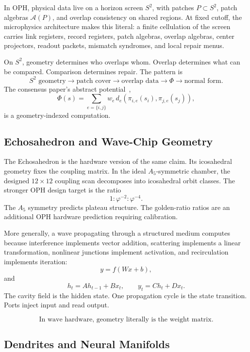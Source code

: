 \documentclass[11pt]{article}
\theoremstyle{remark}
\theoremstyle{plain}
\begin{document}
In OPH, physical data live on a horizon screen \(S^2\), with patches \(P\subset S^2\), patch algebras \(\mathcal A(P)\), and overlap consistency on shared regions. At fixed cutoff, the microphysics architecture makes this literal: a finite cellulation of the screen carries link registers, record registers, patch algebras, overlap algebras, center projectors, readout packets, mismatch syndromes, and local repair menus.

On \(S^2\), geometry determines who overlaps whom. Overlap determines what can be compared. Comparison determines repair. The pattern is
\[
\boxed{
S^2\text{ geometry}
\to
\text{patch cover}
\to
\text{overlap data}
\to
\Phi
\to
\text{normal form}.
}
\]
The consensus paper's abstract potential~\cite{RealityAsConsensusProtocol},
\[
\Phi(s)=
\sum_{e=\{i,j\}}
w_e\,d_e(\pi_{i,e}(s_i),\pi_{j,e}(s_j)),
\]
is a geometry-indexed computation.

\subsection{Echosahedron and Wave-Chip Geometry}

The Echosahedron is the hardware version of the same claim. Its icosahedral geometry fixes the coupling matrix. In the ideal \(A_5\)-symmetric chamber, the designed \(12\times12\) coupling scan decomposes into icosahedral orbit classes. The stronger OPH design target is the ratio
\[
1:\varphi^{-2}:\varphi^{-4}.
\]
The \(A_5\) symmetry predicts plateau structure. The golden-ratio ratios are an additional OPH hardware prediction requiring calibration.

More generally, a wave propagating through a structured medium computes because interference implements vector addition, scattering implements a linear transformation, nonlinear junctions implement activation, and recirculation implements iteration:
\[
y=f(Wx+b),
\]
and
\[
h_t=A h_{t-1}+B x_t,\qquad
y_t=C h_t+D x_t.
\]
The cavity field is the hidden state. One propagation cycle is the state transition. Ports inject input and read output.

\[
\boxed{
\text{In wave hardware, geometry literally is the weight matrix.}
}
\]

\subsection{Dendrites and Neural Manifolds}
\end{document}
